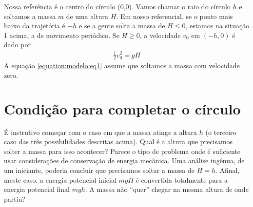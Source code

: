 \documentclass[letterpaper,10pt,english]{jupyterBook}
\begin{document}
\sphinxAtStartPar
Nossa referência é o centro do círculo (0,0). Vamos chamar o raio do círculo \(h\) e soltamos a massa \(m\) de uma altura \(H\). Em nosso referencial, se o ponto mais baixo da trajetória é \(-h\) e se a gente solta a massa de \(H \leq 0\), estamos na situação 1 acima, a de movimento periódico.  Se \(H \geq 0\), a velocidade \(v_0\) em \((-h,0)\) é dado por
\begin{equation}\label{equation:modelo:eq1}
\begin{split}
\frac{1}{2}v_{0}^{2} = gH 
\end{split}
\end{equation}
\sphinxAtStartPar
A equação \eqref{equation:modelo:eq1} assume que soltamos a massa com velocidade zero.


\section{Condição para  completar o círculo}
\label{\detokenize{modelo:condicao-para-justamente-completar-o-circulo}}
\sphinxAtStartPar
É instrutivo começar com o caso em que a massa atinge  a altura \(h\) (o terceiro caso das três possibilidades descritas acima). Qual é a altura que precisamos solter a massa para isso acontecer? Parece o tipo de problema onde é suficiente usar considerações de conservação de energia mecânica. Uma análise ingênua, de um iniciante, poderia concluir que precisamos soltar a massa de \(H=h\). Afinal, meste caso, a energia potencial inicial \(mgH\) é convertida totalmente para a energia potencial final \(mgh\). A massa não “quer” chegar na mesma altura de onde partiu?
\end{document}
